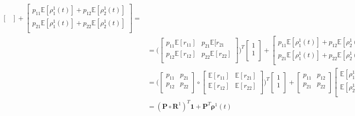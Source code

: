 \documentclass[\main/main.tex]{subfiles}
\begin{document}
\begin{equation}
\begin{split}
\begin{bmatrix}
 \end{bmatrix}
 + 
 \begin{bmatrix} 
 p_{11}\mathds{E}[\rho_1^1(t)] + p_{12}\mathds{E}[\rho_2^1(t)] \\
 p_{21}\mathds{E}[\rho_1^1(t)] + 
 p_{22}\mathds{E}[\rho_2^1(t)]\\
 \end{bmatrix} =\\
 &= \Bigg( \begin{bmatrix} 
 p_{11}\mathds{E}[r_{11}] & p_{21}\mathds{E}[r_{21}\\
 p_{12}\mathds{E}[r_{12}]&  p_{22} \mathds{E}[r_{22}]\\
 \end{bmatrix}
  \Bigg) ^T
  \begin{bmatrix}
 1\\
 1\\
 \end{bmatrix}
 + 
 \begin{bmatrix} 
 p_{11}\mathds{E}[\rho_1^1(t)] + p_{12}\mathds{E}[\rho_2^1(t)] \\
 p_{21}\mathds{E}[\rho_1^1(t)] + 
 p_{22}\mathds{E}[\rho_2^1(t)]\\
 \end{bmatrix} =\\
 &= \Bigg(
\begin{bmatrix} 
 p_{11}& p_{21}\\
 p_{12}& p_{22}\\
 \end{bmatrix} \circ
 \begin{bmatrix} 
 \mathds{E}[r_{11}] &  \mathds{E}[r_{21}] \\
 \mathds{E}[r_{12}] &  \mathds{E}[r_{22}] \\
 \end{bmatrix}
 \Bigg) ^T
 \begin{bmatrix}
 1\\
 1\\
 \end{bmatrix}
 + 
 \begin{bmatrix} 
 p_{11}& p_{12}\\
 p_{21}& p_{22}\\
 \end{bmatrix}
 \begin{bmatrix}
      \mathds{E}[\rho_1^1(t)]\\
      \mathds{E}[\rho_2^1(t)]\\
\end{bmatrix}= \\
&= (\mathbf{P} \circ \mathbf{R}^1)^T \mathbf{1} + \mathbf{P}^T \bm{\rho}^1(t) \\
\end{split}
\end{equation}
\end{document}
